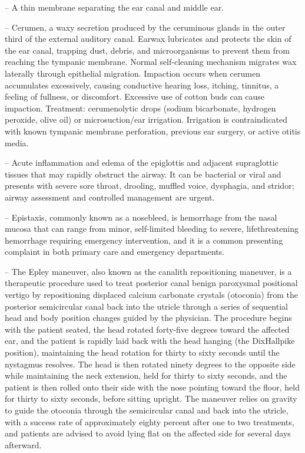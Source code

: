 -- A thin membrane separating the ear canal and middle ear.

-- Cerumen, a waxy secretion produced by the ceruminous glands in the outer third of the external auditory canal. Earwax lubricates and protects the skin of the ear canal, trapping dust, debris, and microorganisms to prevent them from reaching the tympanic membrane. Normal self-cleaning mechanism migrates wax laterally through epithelial migration. Impaction occurs when cerumen accumulates excessively, causing conductive hearing loss, itching, tinnitus, a feeling of fullness, or discomfort. Excessive use of cotton buds can cause impaction. Treatment: cerumenolytic drops (sodium bicarbonate, hydrogen peroxide, olive oil) or microsuction/ear irrigation. Irrigation is contraindicated with known tympanic membrane perforation, previous ear surgery, or active otitis media.

-- Acute inflammation and edema of the epiglottis and adjacent supraglottic tissues that may rapidly obstruct the airway. It can be bacterial or viral and presents with severe sore throat, drooling, muffled voice, dysphagia, and stridor; airway assessment and controlled management are urgent.

-- Epistaxis, commonly known as a nosebleed, is hemorrhage from the nasal mucosa that can range from minor, self-limited bleeding to severe, lifethreatening hemorrhage requiring emergency intervention, and it is a common presenting complaint in both primary care and emergency departments.

-- The Epley maneuver, also known as the canalith repositioning maneuver, is a therapeutic procedure used to treat posterior canal benign paroxysmal positional vertigo by repositioning displaced calcium carbonate crystals (otoconia) from the posterior semicircular canal back into the utricle through a series of sequential head and body position changes guided by the physician. The procedure begins with the patient seated, the head rotated forty-five degrees toward the affected ear, and the patient is rapidly laid back with the head hanging (the DixHallpike position), maintaining the head rotation for thirty to sixty seconds until the nystagmus resolves. The head is then rotated ninety degrees to the opposite side while maintaining the neck extension, held for thirty to sixty seconds, and the patient is then rolled onto their side with the nose pointing toward the floor, held for thirty to sixty seconds, before sitting upright. The maneuver relies on gravity to guide the otoconia through the semicircular canal and back into the utricle, with a success rate of approximately eighty percent after one to two treatments, and patients are advised to avoid lying flat on the affected side for several days afterward.


